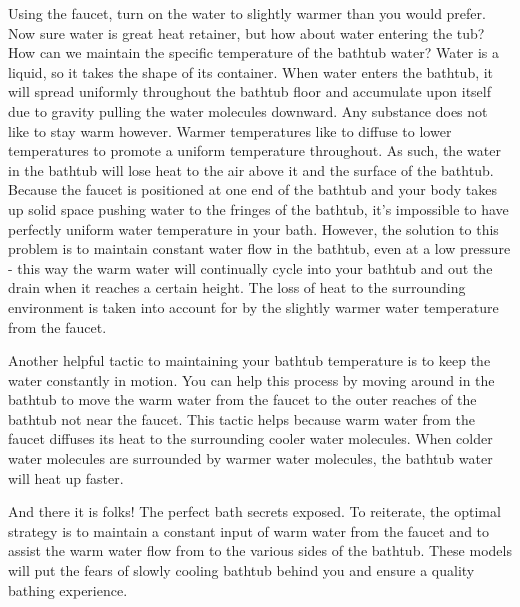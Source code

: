 \documentclass[10pt]{article}
\begin{document}
	Using the faucet, turn on the water to slightly warmer than you would prefer. Now sure water is great heat retainer, but how about water entering the tub? How can we maintain the specific temperature of the bathtub water? Water is a liquid, so it takes the shape of its container. When water enters the bathtub, it will spread uniformly throughout the bathtub floor and accumulate upon itself due to gravity pulling the water molecules downward. Any substance does not like to stay warm however. Warmer temperatures like to diffuse to lower temperatures to promote a uniform temperature throughout. As such, the water in the bathtub will lose heat to the air above it and the surface of the bathtub. Because the faucet is positioned at one end of the bathtub and your body takes up solid space pushing water to the fringes of the bathtub, it's impossible to have perfectly uniform water temperature in your bath. However, the solution to this problem is to maintain constant water flow in the bathtub, even at a low pressure - this way the warm water will continually cycle into your bathtub and out the drain when it reaches a certain height. The loss of heat to the surrounding environment is taken into account for by the slightly warmer water temperature from the faucet.
	
	Another helpful tactic to maintaining your bathtub temperature is to keep the water constantly in motion. You can help this process by moving around in the bathtub to move the warm water from the faucet to the outer reaches of the bathtub not near the faucet. This tactic helps because warm water from the faucet diffuses its heat to the surrounding cooler water molecules. When colder water molecules are surrounded by warmer water molecules, the bathtub water will heat up faster.
	
	And there it is folks! The perfect bath secrets exposed. To reiterate, the optimal strategy is to maintain a constant input of warm water from the faucet and to assist the warm water flow from to the various sides of the bathtub. These models will put the fears of slowly cooling bathtub behind you and ensure a quality bathing experience.
	
\end{document}
